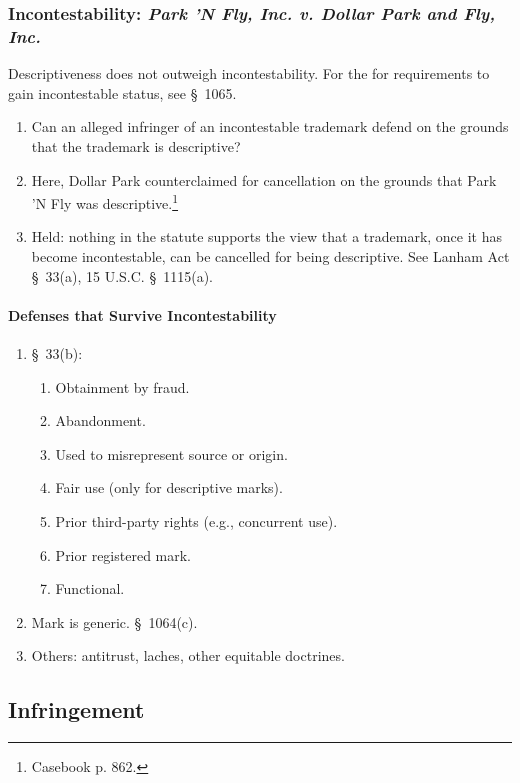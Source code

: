 \subsubsection{Incontestability: \emph{Park 'N Fly, Inc. v. Dollar Park and 
Fly, Inc.}}

Descriptiveness does not outweigh incontestability. For the for requirements 
to gain incontestable status, see \S\ 1065.

\begin{enumerate}
    \item Can an alleged infringer of an incontestable trademark defend on the 
    grounds that the trademark is descriptive?
    \item Here, Dollar Park counterclaimed for cancellation on the grounds 
    that Park 'N Fly was descriptive.\footnote{Casebook p. 862.}
    \item Held: nothing in the statute supports the view that a trademark, 
    once it has become incontestable, can be cancelled for being descriptive. 
    See Lanham Act \S\ 33(a), 15 U.S.C. \S\ 1115(a).
\end{enumerate}

\paragraph{Defenses that Survive Incontestability}

\begin{enumerate}
    \item \S\ 33(b):
    \begin{enumerate}
        \item Obtainment by fraud.
        \item Abandonment.
        \item Used to misrepresent source or origin.
        \item Fair use (only for descriptive marks).
        \item Prior third-party rights (e.g., concurrent use).
        \item Prior registered mark.
        \item Functional.
    \end{enumerate}
    \item Mark is generic. \S\ 1064(c).
    \item Others: antitrust, laches, other equitable doctrines.
\end{enumerate}

\subsection{Infringement}

